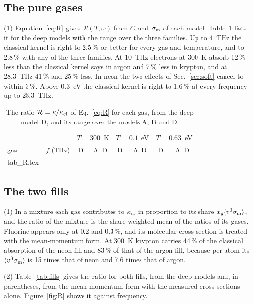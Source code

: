 \documentclass[11pt]{article}
\makeatletter
\numberwithin{equation}{section}
\newcommand{\tabinput}[1]{\@@input #1 }
\newcommand{\sm}{\sigma_{\rm m}}
\makeatother
\begin{document}
\subsection{The pure gases}
{\noindent}(1) Equation~\eqref{eq:R} gives $\mathcal R(T,\omega)$ from $G$ and
$\sm$ of each model. Table~\ref{tab:R} lists it for the deep models with the
range over the three families. Up to 4~THz the classical kernel is right to
2.5\,\% or better for every gas and temperature, and to 2.8\,\% with any of the
three families. At 10~THz electrons at 300~K
absorb 12\,\% less than the classical kernel says in argon and 7\,\% less in
krypton, and at 28.3~THz 41\,\% and 25\,\% less. In neon the two effects of
Sec.~\ref{sec:soft} cancel to within 3\,\%. Above 0.3~eV the classical kernel
is right to 1.6\,\% at every frequency up to 28.3~THz.

\begin{table}[ht]
\caption{The ratio $\mathcal R=\kappa/\kappa_{\rm cl}$ of Eq.~\eqref{eq:R} for
each gas, from the deep model D, and its range over the models A, B and D.}
\label{tab:R}
\begin{center}
\begin{tabular}{lccccccc}
\toprule
 & & \multicolumn{2}{c}{$T=300$~K} & \multicolumn{2}{c}{$T=0.1$~eV} & \multicolumn{2}{c}{$T=0.63$~eV}\\
gas & $f$ (THz) & D & A--D & D & A--D & D & A--D\\
\midrule
\tabinput{tab_R.tex}
\bottomrule
\end{tabular}
\end{center}
\end{table}

\subsection{The two fills}
{\noindent}(1) In a mixture each gas contributes to $\kappa_{\rm cl}$ in
proportion to its share $x_g\langle v^3\sm\rangle$, and the ratio of the
mixture is the share-weighted mean of the ratios of its gases. Fluorine
appears only at 0.2 and 0.3\,\%, and its molecular cross section is treated
with the mean-momentum form. At 300~K krypton carries 44\,\% of the classical
absorption of the neon fill and 83\,\% of that of the argon fill, because per
atom its $\langle v^3\sm\rangle$ is 15 times that of neon and 7.6 times that of
argon.

{\noindent}(2) Table~\ref{tab:fills} gives the ratio for both fills, from the
deep models and, in parentheses, from the mean-momentum form with the measured
cross sections alone. Figure~\ref{fig:R} shows it against frequency.
\end{document}
